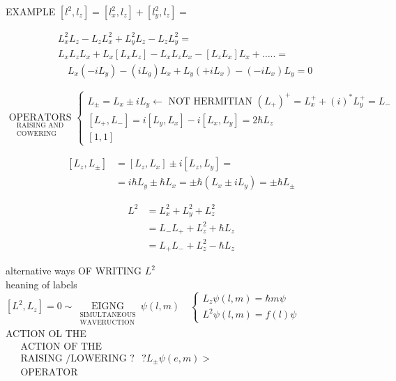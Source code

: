 \documentclass[10pt]{article}
\begin{document}
EXAMPLE $\left[l^{2}, l_{z}\right]=\left[l_{x}^{2}, l_{z}\right]+\left[l_{y}^{2}, l_{z}\right]=$

$$
\begin{aligned}
& L_{x}^{2} L_{z}-L_{z} L_{x}^{2}+L_{y}^{2} L_{z}-L_{z} L_{y}^{2}= \\
& L_{x} L_{z} L_{x}+L_{x}\left[L_{x} L_{z}\right]-L_{x} L_{z} L_{x}-\left[L_{z} L_{x}\right] L_{x}+\ldots . .= \\
& \quad L_{x}\left(-i L_{y}\right)-\left(i L_{g}\right) L_{x}+L_{y}\left(+i L_{x}\right)-\left(-i L_{x}\right) L_{y}=0
\end{aligned}
$$

$\underset{\substack{\text { RAISING AND } \\ \text { COWERING }}}{\text { OPERATORS }}\left\{\begin{array}{l}L_{ \pm}=L_{x} \pm i L_{y} \leftarrow \text { NOT HERMITIAN }\left(L_{+}\right)^{+}=L_{x}^{+}+(i)^{*} L_{y}^{+}=L_{-} \\ {\left[L_{+}, L_{-}\right]=i\left[L_{y}, L_{x}\right]-i\left[L_{x}, L_{y}\right]=2 \hbar L_{z}} \\ {[1,1]}\end{array}\right.$

$$
\begin{aligned}
{\left[L_{z}, L_{ \pm}\right] } & =\left[L_{z}, L_{x}\right] \pm i\left[L_{z}, L_{y}\right]= \\
& =i \hbar L_{y} \pm \hbar L_{x}= \pm \hbar\left(L_{x} \pm i L_{y}\right)= \pm \hbar L_{ \pm}
\end{aligned}
$$

$$
\begin{aligned}
L^{2} & =L_{x}^{2}+L_{y}^{2}+L_{z}^{2} \\
& =L_{-} L_{+}+L_{z}^{2}+\hbar L_{z} \\
& =L_{+} L_{-}+L_{z}^{2}-\hbar L_{z}
\end{aligned}
$$

alternative ways OF WRITING $L^{2}$\\
heaning of labels\\
$\left[L^{2}, L_{z}\right]=0 \sim \underset{\substack{\text { SIMULTANEOUS } \\ \text { WAVERUCTION }}}{\text { EIGNG }} \psi(l, m) \quad\left\{\begin{array}{l}L_{z} \psi(l, m)=\hbar m \psi \\ L^{2} \psi(l, m)=f(l) \psi\end{array}\right.$\\
ACTION OL THE\\
$\begin{aligned} & \text { ACTION OF THE } \\ & \text { RAISING /LOWERING ? } \\ & \text { OPERATOR }\end{aligned} ? L_{ \pm} \psi(e, m)>$
\end{document}
